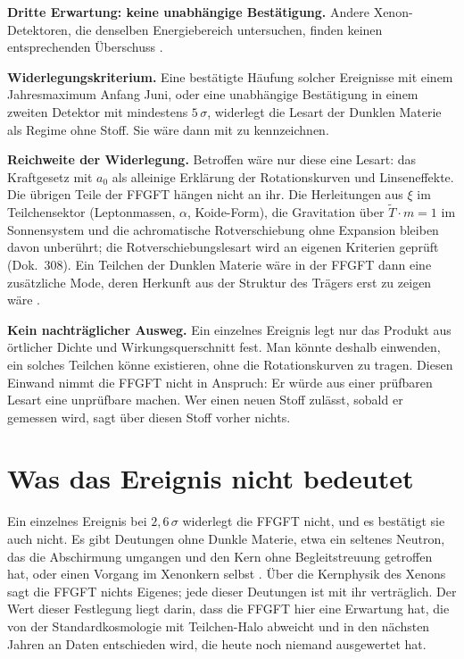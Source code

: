 \textbf{Dritte Erwartung: keine unabhängige Bestätigung.} Andere Xenon-Detektoren, die denselben
Energiebereich untersuchen, finden keinen entsprechenden Überschuss \SM.

\textbf{Widerlegungskriterium.} Eine bestätigte Häufung solcher Ereignisse mit einem Jahresmaximum
Anfang Juni, oder eine unabhängige Bestätigung in einem zweiten Detektor mit mindestens
$5\,\sigma$, widerlegt die Lesart der Dunklen Materie als Regime ohne Stoff. Sie wäre dann mit \XM{}
zu kennzeichnen.

\textbf{Reichweite der Widerlegung.} Betroffen wäre nur diese eine Lesart: das Kraftgesetz mit
$a_0$ als alleinige Erklärung der Rotationskurven und Linseneffekte. Die übrigen Teile der FFGFT
hängen nicht an ihr. Die Herleitungen aus $\xi$ im Teilchensektor (Leptonmassen, $\alpha$, Koide-Form),
die Gravitation über $\tilde T\cdot m=1$ im Sonnensystem und die achromatische Rotverschiebung ohne
Expansion bleiben davon unberührt; die Rotverschiebungslesart wird an eigenen Kriterien geprüft
(Dok.~308). Ein Teilchen der Dunklen Materie wäre in der FFGFT dann eine zusätzliche Mode, deren
Herkunft aus der Struktur des Trägers erst zu zeigen wäre \SM.

\textbf{Kein nachträglicher Ausweg.} Ein einzelnes Ereignis legt nur das Produkt aus örtlicher
Dichte und Wirkungsquerschnitt fest. Man könnte deshalb einwenden, ein solches Teilchen könne
existieren, ohne die Rotationskurven zu tragen. Diesen Einwand nimmt die FFGFT nicht in Anspruch:
Er würde aus einer prüfbaren Lesart eine unprüfbare machen. Wer einen neuen Stoff zulässt, sobald er
gemessen wird, sagt über diesen Stoff vorher nichts.

\section{Was das Ereignis nicht bedeutet}

Ein einzelnes Ereignis bei $2{,}6\,\sigma$ widerlegt die FFGFT nicht, und es bestätigt sie auch
nicht. Es gibt Deutungen ohne Dunkle Materie, etwa ein seltenes Neutron, das die Abschirmung
umgangen und den Kern ohne Begleitstreuung getroffen hat, oder einen Vorgang im Xenonkern selbst
\QM. Über die Kernphysik des Xenons sagt die FFGFT nichts Eigenes; jede dieser Deutungen ist mit ihr
verträglich. Der Wert dieser Festlegung liegt darin, dass die FFGFT hier eine Erwartung hat, die von
der Standardkosmologie mit Teilchen-Halo abweicht und in den nächsten Jahren an Daten entschieden
wird, die heute noch niemand ausgewertet hat.

